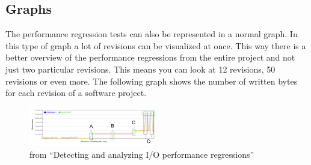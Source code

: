 \subsection{Graphs}
The performance regression tests can also be represented in a normal graph. In this type of graph a lot of revisions can be visualized at once. This way there is a better overview of the performance regressions from the entire project and not just two particular revisions. This means you can look at 12 revisions, 50 revisions or even more. The following graph shows the number of written bytes for each revision of a software project.

\begin{figure}[h]
\begin{center}
  \includegraphics[width=0.5\textwidth]{Figures/bytegraph.png}
\end{center}
  \caption{from ``Detecting and analyzing I/O performance regressions''\cite{bezemer2014detecting}}

\end{figure}









